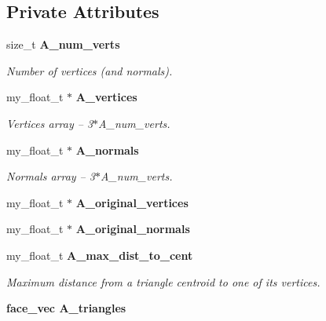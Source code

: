 \subsection*{Private Attributes}
\begin{CompactItemize}
\item 
size\_\-t \bf{A\_\-num\_\-verts}\label{classASCbase_1_1geometry_1_1SimpleTrimeshTwo_a490f1dccbf7067fcdc19db0f6501cc2}

\begin{CompactList}\small\item\em Number of vertices (and normals). \item\end{CompactList}\item 
my\_\-float\_\-t $\ast$ \bf{A\_\-vertices}\label{classASCbase_1_1geometry_1_1SimpleTrimeshTwo_5392ac1e8187163453ee7747239595bb}

\begin{CompactList}\small\item\em Vertices array -- 3$\ast$A\_\-num\_\-verts. \item\end{CompactList}\item 
my\_\-float\_\-t $\ast$ \bf{A\_\-normals}\label{classASCbase_1_1geometry_1_1SimpleTrimeshTwo_114534e67258df0c622185754cc4c68a}

\begin{CompactList}\small\item\em Normals array -- 3$\ast$A\_\-num\_\-verts. \item\end{CompactList}\item 
my\_\-float\_\-t $\ast$ \textbf{A\_\-original\_\-vertices}\label{classASCbase_1_1geometry_1_1SimpleTrimeshTwo_52aed34d252b1f014b4e35b465dc1390}

\item 
my\_\-float\_\-t $\ast$ \textbf{A\_\-original\_\-normals}\label{classASCbase_1_1geometry_1_1SimpleTrimeshTwo_a9e5923eab5e801a941a3babc6e1dbce}

\item 
my\_\-float\_\-t \bf{A\_\-max\_\-dist\_\-to\_\-cent}\label{classASCbase_1_1geometry_1_1SimpleTrimeshTwo_8aa0b21c34497bc3cefd99416dcaf28b}

\begin{CompactList}\small\item\em Maximum distance from a triangle centroid to one of its vertices. \item\end{CompactList}\item 
\bf{face\_\-vec} \bf{A\_\-triangles}\label{classASCbase_1_1geometry_1_1SimpleTrimeshTwo_b820c45884fc49cf977b91b04435acb2}


\end{CompactItemize}
